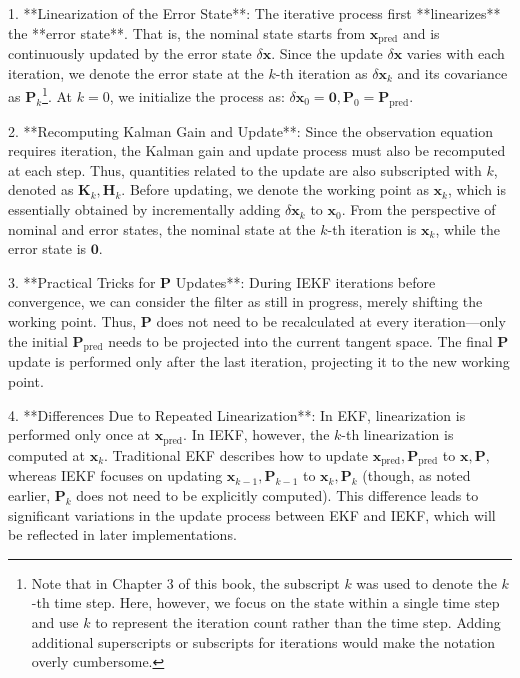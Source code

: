 1. **Linearization of the Error State**: The iterative process first **linearizes** the **error state**. That is, the nominal state starts from \(\bm{x}_{\mathrm{pred}}\) and is continuously updated by the error state \(\delta \bm{x}\). Since the update \(\delta \bm{x}\) varies with each iteration, we denote the error state at the \(k\)-th iteration as \(\delta \bm{x}_k\) and its covariance as \(\bm{P}_k\)\footnote{Note that in Chapter 3 of this book, the subscript \(k\) was used to denote the \(k\)-th time step. Here, however, we focus on the state within a single time step and use \(k\) to represent the iteration count rather than the time step. Adding additional superscripts or subscripts for iterations would make the notation overly cumbersome.}. At \(k=0\), we initialize the process as: \(\delta \bm{x}_{0} = \bm{0}, \bm{P}_0 = \bm{P}_{\mathrm{pred}}\).  

2. **Recomputing Kalman Gain and Update**: Since the observation equation requires iteration, the Kalman gain and update process must also be recomputed at each step. Thus, quantities related to the update are also subscripted with \(k\), denoted as \(\bm{K}_k, \bm{H}_k\). Before updating, we denote the working point as \(\bm{x}_k\), which is essentially obtained by incrementally adding \(\delta \bm{x}_k\) to \(\bm{x}_0\). From the perspective of nominal and error states, the nominal state at the \(k\)-th iteration is \(\bm{x}_k\), while the error state is \(\bm{0}\).  

3. **Practical Tricks for \(\bm{P}\) Updates**: During IEKF iterations before convergence, we can consider the filter as still in progress, merely shifting the working point. Thus, \(\bm{P}\) does not need to be recalculated at every iteration—only the initial \(\bm{P}_{\mathrm{pred}}\) needs to be projected into the current tangent space. The final \(\bm{P}\) update is performed only after the last iteration, projecting it to the new working point.  

4. **Differences Due to Repeated Linearization**: In EKF, linearization is performed only once at \(\bm{x}_{\mathrm{pred}}\). In IEKF, however, the \(k\)-th linearization is computed at \(\bm{x}_k\). Traditional EKF describes how to update \(\bm{x}_{\mathrm{pred}}, \bm{P}_{\mathrm{pred}}\) to \(\bm{x}, \bm{P}\), whereas IEKF focuses on updating \(\bm{x}_{k-1}, \bm{P}_{k-1}\) to \(\bm{x}_{k}, \bm{P}_k\) (though, as noted earlier, \(\bm{P}_k\) does not need to be explicitly computed). This difference leads to significant variations in the update process between EKF and IEKF, which will be reflected in later implementations.  

